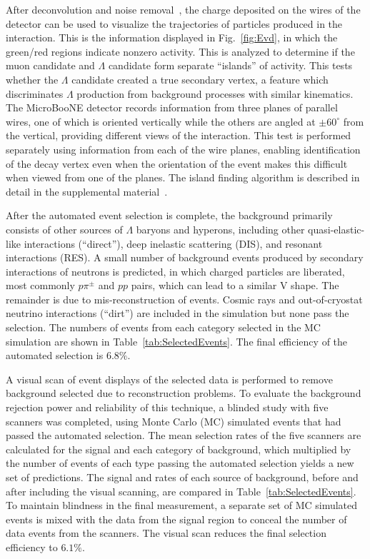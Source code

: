 \documentclass[aps,prl,twocolumn,superscriptaddress]{revtex4}
\begin{document}
After deconvolution and noise removal~\cite{MicroBooNE:2018swd,MicroBooNE:2018swe,MicroBooNE:2017qiu}, the charge deposited on the wires of the detector can be used to visualize the trajectories of particles produced in the interaction. This is the information displayed in Fig.~\ref{fig:Evd}, in which the green/red regions indicate nonzero activity. This is analyzed to determine if the muon candidate and $\Lambda$ candidate form separate ``islands'' of activity. This tests whether the $\Lambda$ candidate created a true secondary vertex, a feature which discriminates $\Lambda$ production from background processes with similar kinematics. The MicroBooNE detector records information from three planes of parallel wires, one of which is oriented vertically while the others are angled at $\pm 60^{\circ}$ from the vertical, providing different views of the interaction. This test is performed separately using information from each of the wire planes, enabling identification of the decay vertex even when the orientation of the event makes this difficult when viewed from one of the planes. The island finding algorithm is described in detail in the supplemental material~\cite{SupplementalMaterial}.

After the automated event selection is complete, the background primarily consists of other sources of $\Lambda$ baryons and hyperons, including other quasi-elastic-like interactions (``direct''), deep inelastic scattering (DIS), and resonant interactions (RES). A small number of background events produced by secondary interactions of neutrons is predicted, in which charged particles are liberated, most commonly $p\pi^{\pm}$ and $pp$ pairs, which can lead to a similar V shape. The remainder is due to mis-reconstruction of events. Cosmic rays and out-of-cryostat neutrino interactions (``dirt'') are included in the simulation but none pass the selection. The numbers of events from each category selected in the MC simulation are shown in Table~\ref{tab:SelectedEvents}. The final efficiency of the automated selection is $6.8\%$.

A visual scan of event displays of the selected data is performed to remove background selected due to reconstruction problems. To evaluate the background rejection power and reliability of this technique, a blinded study with five scanners was completed, using Monte Carlo (MC) simulated events that had passed the automated selection. The mean selection rates of the five scanners are calculated for the signal and each category of background, which multiplied by the number of events of each type passing the automated selection yields a new set of predictions. The signal and rates of each source of background, before and after including the visual scanning, are compared in Table~\ref{tab:SelectedEvents}. To maintain blindness in the final measurement, a separate set of MC simulated events is mixed with the data from the signal region to conceal the number of data events from the scanners. The visual scan reduces the final selection efficiency to $6.1\%$.
\end{document}
